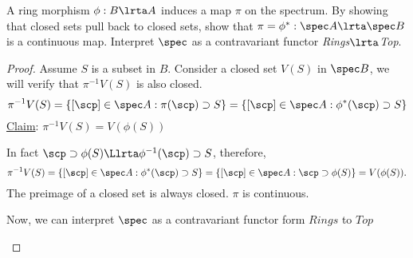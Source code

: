 \begin{exr}\label{exr:spec_functor} A ring morphism
$\phi: B\lrta A$ induces a map $\pi$ on the spectrum. By showing that closed sets pull back to closed sets, show that $\pi=\phi^*:\spec A\lrta \spec B$ is a continuous map. Interpret $\spec$ as a contravariant functor \textit{Rings}$\lrta$\textit{Top}.
\end{exr}
\begin{proof}
Assume $S$ is a subset in $B$. Consider a closed set $V(S)$ in $\spec B$, we will verify that $\pi^{-1}V(S)$ is also closed.
$$
\pi^{-1}V(S)=\{[\scp]\in \spec A: \pi(\scp)\supset S\}=\{[\scp]\in \spec A: \phi^*(\scp)\supset S\}
$$
\underline{Claim}: $\pi^{-1}V(S)=V(\phi(S))$

In fact $\scp\supset \phi(S)\Llrta \phi^{-1}(\scp)\supset S$, therefore,
$$
\pi^{-1}V(S)=\{[\scp]\in \spec A: \phi^*(\scp)\supset S\}=\{[\scp]\in \spec A: \scp\supset \phi(S)\}=V(\phi(S)).
$$
The preimage of a closed set is always closed. $\pi$ is continuous.

Now, we can interpret $\spec$ as a contravariant functor form $Rings$ to $Top$

\begin{center}
\end{center}
\end{proof}


